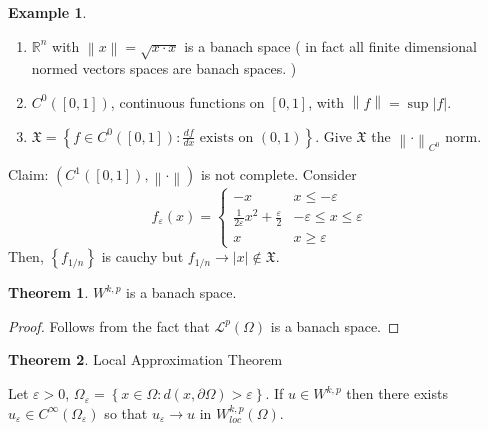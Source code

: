\documentclass[12pt, a4paper]{article}
\theoremstyle{definition}
\newtheorem{thm}{Theorem}
\newtheorem{example}{Example}
\newcommand{\X}{\mathfrak{X}}
\newcommand{\R}{\mathbb{R}}                           %
\newcommand{\eL}{\mathcal{L}}                         %
\newcommand{\bd}{\partial}
\newcommand{\ep}{\varepsilon}
\newcommand{\norm}[1]{\left\lVert#1\right\rVert}
\begin{document}
\begin{tcolorbox}[colback = white]
\begin{example}
\end{example}
\begin{enumerate}[label = \roman*)]
	\item $\R^n$ with $ \norm{x} = \sqrt{x\cdot x}$ is a banach space ( in fact all finite dimensional normed vectors spaces are banach spaces. )
	\item $C^0([0,1])$, continuous functions on $[0,1]$, with $ \norm{f} = \sup |f|$. 
	\item $\X = \left\{ f \in C^0([0,1]) : \frac{ df }{ dx } \text{ exists on } (0,1) \right\}$. Give $\X$ the $ \norm{\cdot}_{C^0}$ norm. 
\end{enumerate}
\end{tcolorbox}
Claim: $ \left( C^1([0,1]), \norm{\cdot} \right)$ is not complete. Consider
$$ f_\ep(x) = \begin{cases}
	-x  & x \leq - \ep
	\\ \frac{ 1 }{ 2\ep }x^2 + \frac{ \ep }{ 2 } & -\ep \leq x \leq \ep
	\\ x & x \geq \ep
\end{cases}  $$ 
Then, $ \left\{ f_{1/n} \right\}$ is cauchy but $f_{1/n} \to |x| \not \in \X$. 
\begin{tcolorbox}[colback = white]
\begin{thm}
	$W^{k,p}$ is a banach space. 
\end{thm}
\end{tcolorbox}
\begin{proof}
	Follows from the fact that $\eL^p(\Omega)$ is a banach space. 
\end{proof}
\begin{tcolorbox}[colback = white]
\begin{thm}
Local Approximation Theorem
\end{thm}
	Let $\ep >0$, $\Omega_\ep = \left\{ x \in \Omega : d(x, \bd \Omega) > \ep \right\}. $
	If $u\in W^{k,p}$ then there exists $u_\ep \in C^\infty(\Omega_\ep)$ so that $u_\ep \to u$ in $W^{k,p}_{loc}(\Omega)$. 
\end{tcolorbox}
\end{document}

